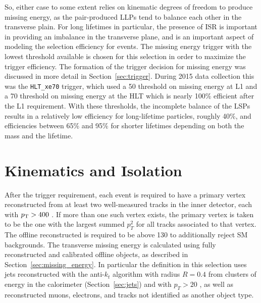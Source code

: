 So, either case to some extent relies on kinematic degrees of freedom to produce missing energy, as the pair-produced \acp{LLP} tend to balance each other in the transverse plain.
For long lifetimes in particular, the presence of \ac{ISR} is important in providing an imbalance in the transverse plane, and is an important aspect of modeling the selection efficiency for \rhadron events.
The missing energy trigger with the lowest threshold available is chosen for this selection in order to maximize the trigger efficiency. 
The formation of the trigger decision for missing energy was discussed in more detail in Section~\ref{sec:trigger}.
During 2015 data collection this was the \texttt{HLT\_xe70} trigger, which used a 50 \GeV threshold on missing energy at L1 and a 70 \GeV threshold on missing energy at the HLT which is nearly 100\% efficient after the L1 requirement.
With these thresholds, the incomplete balance of the \acp{LSP} results in a relatively low efficiency for long-lifetime particles, roughly 40\%, and efficiencies between 65\% and 95\% for shorter lifetimes depending on both the mass and the lifetime.




\section{Kinematics and Isolation}
\label{sec:track_requirements}

After the trigger requirement, each event is required to have a primary vertex reconstructed from at least two well-measured tracks in the inner detector, each with $p_{\mathrm{T}} > 400$ \MeV. 
If more than one such vertex exists, the primary vertex is taken to be the one with the largest summed $p_T^2$ for all tracks associated to that vertex. 
The offline reconstructed \met is required to be above 130 \GeV to additionally reject \ac{SM} backgrounds.
The transverse missing energy is calculated using fully reconstructed and calibrated offline objects, as described in Section~\ref{sec:missing_energy}. 
In particular the \met definition in this selection uses jets reconstructed with the anti-$k_t$ algorithm with radius $R = 0.4$ from clusters of energy in the calorimeter (Section~\ref{sec:jets}) and with $p_T > 20$ \GeV, as well as reconstructed muons, electrons, and tracks not identified as another object type.

